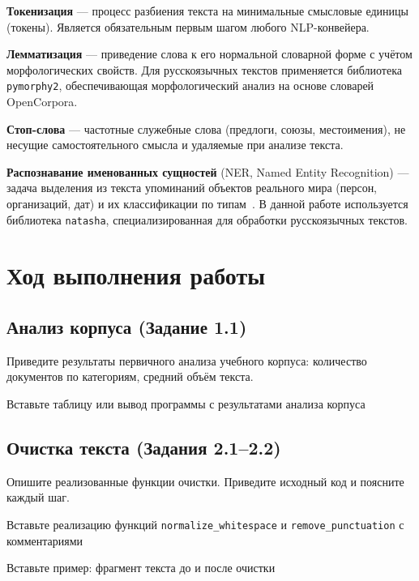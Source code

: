 \documentclass[12pt, a4paper]{report}
\newcommand{\placeholder}[2][Вставьте результат]{%
  \begin{tcolorbox}[placeholderbox, title={#2}]
    #1
  \end{tcolorbox}%
  \vspace{4pt}%
}
\begin{document}
\textbf{Токенизация} — процесс разбиения текста на минимальные смысловые единицы (токены).
Является обязательным первым шагом любого NLP-конвейера.

\textbf{Лемматизация} — приведение слова к его нормальной словарной форме с учётом
морфологических свойств. Для русскоязычных текстов применяется библиотека \texttt{pymorphy2},
обеспечивающая морфологический анализ на основе словарей OpenCorpora.

\textbf{Стоп-слова} — частотные служебные слова (предлоги, союзы, местоимения),
не несущие самостоятельного смысла и удаляемые при анализе текста.

\textbf{Распознавание именованных сущностей} (NER, Named Entity Recognition) —
задача выделения из текста упоминаний объектов реального мира (персон, организаций,
дат) и их классификации по типам~\cite{lec1}. В данной работе используется библиотека
\texttt{natasha}, специализированная для обработки русскоязычных текстов.

\chapter{Ход выполнения работы}

\section{Анализ корпуса (Задание 1.1)}

Приведите результаты первичного анализа учебного корпуса: количество документов по
категориям, средний объём текста.

\placeholder[Вставьте таблицу или вывод программы с результатами анализа корпуса]{Результаты анализа корпуса}

\section{Очистка текста (Задания 2.1–2.2)}

Опишите реализованные функции очистки. Приведите исходный код и поясните каждый шаг.

\placeholder[Вставьте реализацию функций \texttt{normalize\_whitespace} и \texttt{remove\_punctuation} с комментариями]{Код функций очистки}

\placeholder[Вставьте пример: фрагмент текста до и после очистки]{Пример результата очистки}
\end{document}
